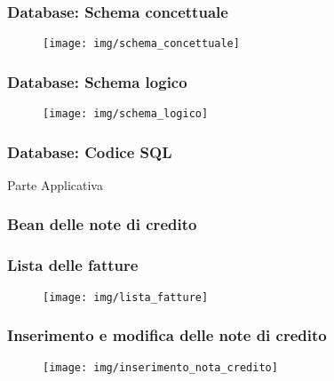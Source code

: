 \documentclass[]{beamer}
\begin{document}
    \begin{frame}
        \frametitle{Database: Schema concettuale}
        \begin{figure}[H]
            \centering
            \texttt{[image: img/schema\_concettuale]}\label{schema:concettuale}
        \end{figure}
    \end{frame}

    \begin{frame}
        \frametitle{Database: Schema logico}
        \begin{figure}[H]
            \centering
            \texttt{[image: img/schema\_logico]}\label{schema:logico}
        \end{figure}
    \end{frame}

    \begin{frame}
        \frametitle{Database: Codice SQL}
        
    \end{frame}

    \begin{frame}
        \begin{center}
            \Huge Parte Applicativa
        \end{center}
    \end{frame}

    \begin{frame}
        \frametitle{Bean delle note di credito}
        
    \end{frame}

    \begin{frame}
        \frametitle{Lista delle fatture}
        \begin{figure}[H]
            \centering
            \texttt{[image: img/lista\_fatture]}\label{img:lista_fatture}
        \end{figure}
    \end{frame}

    \begin{frame}
        \frametitle{Inserimento e modifica delle note di credito}
        \begin{figure}[H]
            \centering
            \texttt{[image: img/inserimento\_nota\_credito]}\label{fig:insert}
        \end{figure}
    \end{frame}
\end{document}
